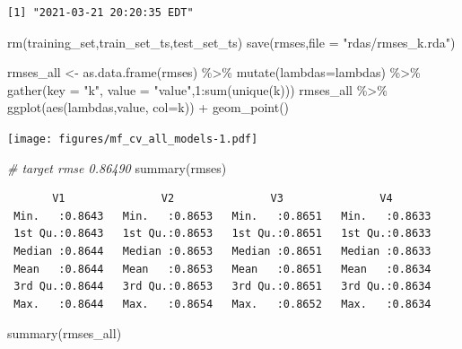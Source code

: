 \documentclass[
]{article}
\newenvironment{Shaded}{}{}
\newcommand{\AttributeTok}[1]{\textcolor[rgb]{0.49,0.56,0.16}{#1}}
\newcommand{\CommentTok}[1]{\textcolor[rgb]{0.38,0.63,0.69}{\textit{#1}}}
\newcommand{\DecValTok}[1]{\textcolor[rgb]{0.25,0.63,0.44}{#1}}
\newcommand{\FunctionTok}[1]{\textcolor[rgb]{0.02,0.16,0.49}{#1}}
\newcommand{\NormalTok}[1]{#1}
\newcommand{\OtherTok}[1]{\textcolor[rgb]{0.00,0.44,0.13}{#1}}
\newcommand{\SpecialCharTok}[1]{\textcolor[rgb]{0.25,0.44,0.63}{#1}}
\newcommand{\StringTok}[1]{\textcolor[rgb]{0.25,0.44,0.63}{#1}}
\begin{document}
\begin{verbatim}
[1] "2021-03-21 20:20:35 EDT"
\end{verbatim}

\begin{Shaded}
\begin{Highlighting}[]
\FunctionTok{rm}\NormalTok{(training\_set,train\_set\_ts,test\_set\_ts)}
\FunctionTok{save}\NormalTok{(rmses,}\AttributeTok{file =} \StringTok{"rdas/rmses\_k.rda"}\NormalTok{)}

\NormalTok{rmses\_all }\OtherTok{\textless{}{-}} \FunctionTok{as.data.frame}\NormalTok{(rmses) }\SpecialCharTok{\%\textgreater{}\%} 
  \FunctionTok{mutate}\NormalTok{(}\AttributeTok{lambdas=}\NormalTok{lambdas) }\SpecialCharTok{\%\textgreater{}\%} 
  \FunctionTok{gather}\NormalTok{(}\AttributeTok{key =} \StringTok{"k"}\NormalTok{, }\AttributeTok{value =} \StringTok{"value"}\NormalTok{,}\DecValTok{1}\SpecialCharTok{:}\FunctionTok{sum}\NormalTok{(}\FunctionTok{unique}\NormalTok{(k))) }
\NormalTok{rmses\_all }\SpecialCharTok{\%\textgreater{}\%} 
  \FunctionTok{ggplot}\NormalTok{(}\FunctionTok{aes}\NormalTok{(lambdas,value, }\AttributeTok{col=}\NormalTok{k)) }\SpecialCharTok{+} 
  \FunctionTok{geom\_point}\NormalTok{()}
\end{Highlighting}
\end{Shaded}

\texttt{[image: figures/mf\_cv\_all\_models-1.pdf]}

\begin{Shaded}
\begin{Highlighting}[]
\CommentTok{\# target rmse 0.86490}
\FunctionTok{summary}\NormalTok{(rmses)}
\end{Highlighting}
\end{Shaded}

\begin{verbatim}
       V1               V2               V3               V4        
 Min.   :0.8643   Min.   :0.8653   Min.   :0.8651   Min.   :0.8633  
 1st Qu.:0.8643   1st Qu.:0.8653   1st Qu.:0.8651   1st Qu.:0.8633  
 Median :0.8644   Median :0.8653   Median :0.8651   Median :0.8633  
 Mean   :0.8644   Mean   :0.8653   Mean   :0.8651   Mean   :0.8634  
 3rd Qu.:0.8644   3rd Qu.:0.8653   3rd Qu.:0.8651   3rd Qu.:0.8634  
 Max.   :0.8644   Max.   :0.8654   Max.   :0.8652   Max.   :0.8634  
\end{verbatim}

\begin{Shaded}
\begin{Highlighting}[]
\FunctionTok{summary}\NormalTok{(rmses\_all)}
\end{Highlighting}
\end{Shaded}
\end{document}
